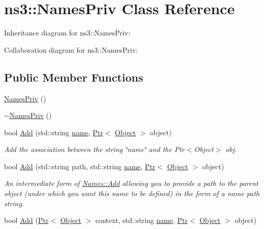 \hypertarget{classns3_1_1NamesPriv}{}\section{ns3\+:\+:Names\+Priv Class Reference}
\label{classns3_1_1NamesPriv}


Inheritance diagram for ns3\+:\+:Names\+Priv\+:


Collaboration diagram for ns3\+:\+:Names\+Priv\+:
\subsection*{Public Member Functions}
\begin{DoxyCompactItemize}
\item 
\hyperlink{classns3_1_1NamesPriv_aa89187c3753da65a97180b31cf77c958}{Names\+Priv} ()
\item 
\hyperlink{classns3_1_1NamesPriv_a903613cb232c09abd3c9d66432124d10}{$\sim$\+Names\+Priv} ()
\item 
bool \hyperlink{classns3_1_1NamesPriv_a1d9bc7794dedbcb88c7f875c084761bb}{Add} (std\+::string \hyperlink{generate__test__data__lte__spectrum__model_8m_ab74e6bf80237ddc4109968cedc58c151}{name}, \hyperlink{classns3_1_1Ptr}{Ptr}$<$ \hyperlink{classns3_1_1Object}{Object} $>$ object)
\begin{DoxyCompactList}\small\item\em Add the association between the string \char`\"{}name\char`\"{} and the Ptr$<$\+Object$>$ obj. \end{DoxyCompactList}\item 
bool \hyperlink{classns3_1_1NamesPriv_a3fba0ecac0cb448f429097581b7d61b3}{Add} (std\+::string path, std\+::string \hyperlink{generate__test__data__lte__spectrum__model_8m_ab74e6bf80237ddc4109968cedc58c151}{name}, \hyperlink{classns3_1_1Ptr}{Ptr}$<$ \hyperlink{classns3_1_1Object}{Object} $>$ object)
\begin{DoxyCompactList}\small\item\em An intermediate form of \hyperlink{classns3_1_1Names_a5075ee36f97059d897cf6430ce61e592}{Names\+::\+Add} allowing you to provide a path to the parent object (under which you want this name to be defined) in the form of a name path string. \end{DoxyCompactList}\item 
bool \hyperlink{classns3_1_1NamesPriv_a26f071c8f39d3c0f07580e4b508087ca}{Add} (\hyperlink{classns3_1_1Ptr}{Ptr}$<$ \hyperlink{classns3_1_1Object}{Object} $>$ context, std\+::string \hyperlink{generate__test__data__lte__spectrum__model_8m_ab74e6bf80237ddc4109968cedc58c151}{name}, \hyperlink{classns3_1_1Ptr}{Ptr}$<$ \hyperlink{classns3_1_1Object}{Object} $>$ object)

\end{DoxyCompactItemize}
